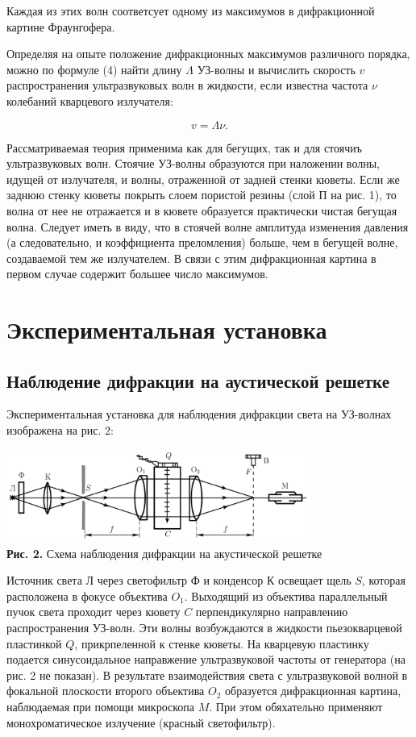 \documentclass[a4paper,12pt]{article} %
\begin{document}
\hfill \break Каждая из этих волн соответсует одному из максимумов в дифракционной картине Фраунгофера.

\hfill \break Определяя на опыте положение дифракционных максимумов различного порядка, можно по формуле (4) найти длину $\Lambda$ УЗ-волны и вычислить скорость $v$ распространения ультразвуковых волн в жидкости, если известна частота $\nu$ колебаний кварцевого излучателя:

\begin{equation}\label{ linkname }
v = \Lambda \nu.
\end{equation}

\hfill \break Рассматриваемая теория применима как для бегущих, так и для стоячиъ ультразвуковых волн. Стоячие УЗ-волны образуются при наложении волны, идущей от излучателя, и волны, отраженной от задней стенки кюветы. Если же заднюю стенку кюветы покрыть слоем пористой резины (слой П на рис. 1), то волна от нее не отражается и в кювете образуется практически чистая бегущая волна. Следует иметь в виду, что в стоячей волне амплитуда изменения давления (а следовательно, и коэффициента преломления) больше, чем в бегущей волне, создаваемой тем же излучателем. В связи с этим дифракционная картина в первом случае содержит большее число максимумов.

\section{Экспериментальная установка}
\subsection{Наблюдение дифракции на аустической решетке}
\hfill \break Экспериментальная установка для наблюдения дифракции света на УЗ-волнах изображена на рис. 2:

\begin{center}
\includegraphics[width=0.75\textwidth]{4.3.2_2.png}\\
\textbf{Рис. 2.} Схема наблюдения дифракции на акустической решетке \\
\end{center}

\hfill \break Источник света Л через светофильтр Ф и конденсор К освещает щель $S$, которая расположена в фокусе объектива $O_{1}$. Выходящий из объектива параллельный пучок света проходит через кювету $C$ перпендикулярно направлению распространения УЗ-волн. Эти волны возбуждаются в жидкости пьезокварцевой пластинкой $Q$, прикрпеленной к стенке кюветы. На кварцевую пластинку подается синусоидальное направжение ультразвуковой частоты от генератора (на рис. 2 не показан). В результате взаимодействия света с ультразвуковой волной в фокальной плоскости второго объектива $O_2$ образуется дифракционная картина, наблюдаемая при помощи микроскопа $M$. При этом обяхательно применяют монохроматическое излучение (красный светофильтр).
\end{document}
